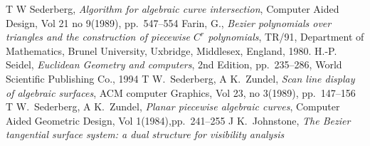 \documentclass[reqno]{amsart}
\theoremstyle{plain}
\begin{document}
\begin{thebibliography}{99}
T W Sederberg, \emph{Algorithm for algebraic curve intersection},
Computer Aided Design, Vol 21 no 9(1989), pp.~547--554
Farin, G., \emph{Bezier polynomials over triangles and the construction of piecewise $C^{r}$ polynomials}, TR/91, Department of Mathematics, Brunel University, Uxbridge, Middlesex, England, 1980.
H.-P. Seidel, \emph{Euclidean Geometry and computers}, 2nd Edition, pp.~235--286, World Scientific Publishing Co., 1994
T W.~Sederberg, A K.~Zundel, \emph{Scan line display of algebraic surfaces}, ACM computer Graphics, Vol 23, no 3(1989), pp.~147--156
T W.~Sederberg, A K.~Zundel, \emph{Planar piecewise algebraic curves}, Computer Aided Geometric Design, Vol 1(1984),pp.~241--255
J K.~Johnstone, \emph{The Bezier tangential surface system: a dual structure for visibility analysis}


\end{thebibliography}
\end{document}
